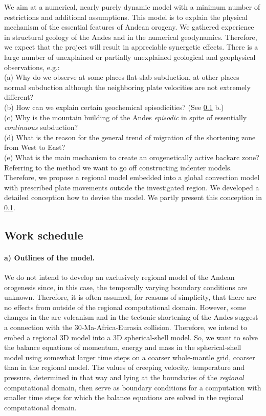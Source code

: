 \documentclass[twoside,10pt]{article}
\begin{document}
We aim at a numerical, nearly purely dynamic model with a minimum number of restrictions and additional assumptions. 
This model is to explain the physical mechanism of the essential features of Andean orogeny. 
We gathered experience in structural geology of the Andes and in the numerical geodynamics. 
Therefore, we expect that the project will result in appreciable synergetic effects. 
There is a large number of unexplained or partially unexplained geological and geophysical observations, e.g.:\\
(a) Why do we observe at some places flat-slab subduction, at other places normal subduction although the neighboring plate velocities are not extremely different? \\
(b) How can we explain certain geochemical episodicities? (See \ref{sec:sched} b.)\\ 
(c) Why is the mountain building of the Andes \emph{episodic} in spite of essentially \emph{continuous} subduction?\\ 
(d) What is the reason for the general trend of migration of the shortening zone from West to East?\\
(e) What is the main mechanism to create an orogenetically active backarc zone?\\ 
Referring to the method we want to go off constructing indenter models.
Therefore, we propose a regional model embedded into a global convection model with prescribed plate movements outside the investigated region. 
We developed a detailed conception how to devise the model.
We partly present this conception in \ref{sec:sched}. 


\subsection{Work schedule}
\label{sec:sched}

\paragraph{a) Outlines of the model.}
We do not intend to develop an exclusively regional model of the Andean orogenesis since, in this case, the temporally varying boundary conditions are unknown. 
Therefore, it is often assumed, for reasons of simplicity, that there are no effects from outside of the regional computational domain. 
However, some changes in the arc volcanism and in the tectonic shortening of the Andes suggest a connection with the 30-Ma-Africa-Eurasia collision. 
Therefore, we intend to embed a regional 3D model into a 3D spherical-shell model.
So, we want to solve the balance equations of momentum, energy and mass in the spherical-shell model using somewhat larger time steps on a coarser whole-mantle grid, coarser than in the regional model. 
The values of creeping velocity, temperature and pressure, determined in that way and lying at the boundaries of the {\em regional\/} computational domain, then serve as boundary conditions for a computation with smaller time steps for which the balance equations are solved in the regional computational domain. 
\end{document}
